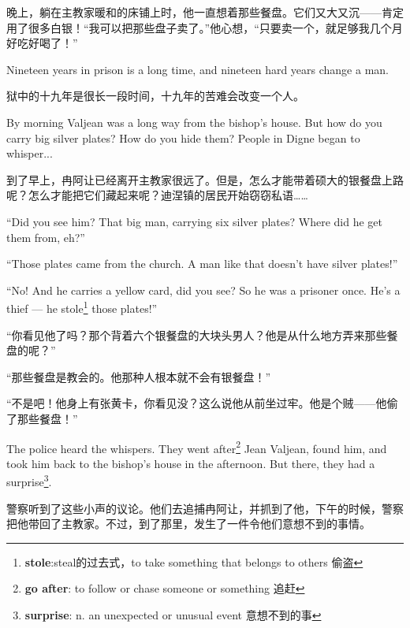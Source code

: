 \documentclass[fontset=ubuntu, zihao=5]{ctexart}
\begin{document}
\begin{paracol}{2}
  \switchcolumn

  晚上，躺在主教家暖和的床铺上时，他一直想着那些餐盘。它们又大又沉——肯定用了很多白银！“我可以把那些盘子卖了。”他心想，“只要卖一个，就足够我几个月好吃好喝了！”

  \switchcolumn*

  Nineteen years in prison is a long time, and nineteen hard years change a man.

  \switchcolumn

  狱中的十九年是很长一段时间，十九年的苦难会改变一个人。

  \switchcolumn*

  \sectionbreak

  By morning Valjean was a long way from the bishop's house. But how do you carry big silver plates? How do you hide them? People in Digne began to whisper...

  \switchcolumn

  \sectionbreak
  到了早上，冉阿让已经离开主教家很远了。但是，怎么才能带着硕大的银餐盘上路呢？怎么才能把它们藏起来呢？迪涅镇的居民开始窃窃私语……


  \switchcolumn*

  ``Did you see him? That big man, carrying six silver plates? Where did he get them from, eh?''

  ``Those plates came from the church. A man like that doesn't have silver plates!''

  ``No! And he carries a yellow card, did you see? So he was a prisoner once.
  He's a thief --- he stole\footnote{\textbf{stole}:steal的过去式，to take
    something that belongs to others 偷盗} those plates!''

  \switchcolumn

  “你看见他了吗？那个背着六个银餐盘的大块头男人？他是从什么地方弄来那些餐盘的呢？”

  “那些餐盘是教会的。他那种人根本就不会有银餐盘！”

  “不是吧！他身上有张黄卡，你看见没？这么说他从前坐过牢。他是个贼——他偷了那些餐盘！”

  \switchcolumn*

  The police heard the whispers. They went after\footnote{\textbf{go after}: to follow or chase someone or something 追赶} Jean Valjean, found him, and took him back to the bishop's house in the afternoon. But there, they had a surprise\footnote{\textbf{surprise}: n. an unexpected or unusual event 意想不到的事}.

  \switchcolumn
  警察听到了这些小声的议论。他们去追捕冉阿让，并抓到了他，下午的时候，警察把他带回了主教家。不过，到了那里，发生了一件令他们意想不到的事情。


\end{paracol}
\end{document}
